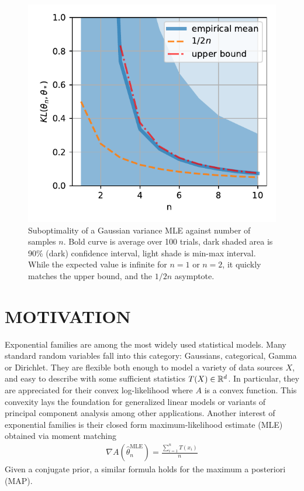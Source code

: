 \documentclass[twoside]{article}
\let\oldsection\section
\renewcommand{\section}[1]{\oldsection{\texorpdfstring{\uppercase{#1}}{#1}}}
\newcommand{\cond}{\,\vert\,}
\newcommand{\logpart}{A}
\newcommand{\nat}{\theta}
\newcommand{\lin}[1]{\left\langle#1\right\rangle}
\begin{document}
\begin{figure}[t]
	\centering
\includegraphics[width=.4\textwidth]{fewsamples.pdf}
	\caption{Suboptimality of a Gaussian variance MLE against number of samples $n$. Bold curve is average over 100 trials,  dark shaded area is 90\% (dark) confidence interval, light shade is min-max interval.
		While the expected value is infinite for $n=1$ or $n=2$, it quickly matches the upper bound, and the $1/2n$ asymptote.
	}
	\label{fig:curves}
\end{figure}


\section{Motivation}

Exponential families are among the most widely used statistical models.
Many standard random variables fall into this category: Gaussians, categorical, Gamma or Dirichlet.
They are flexible both enough to model a variety of data sources $X$, and easy to describe with some sufficient statistics $T(X) \in \mathbb{R}^d$.
In particular, they are appreciated for their convex log-likelihood
\alignn{
f(\nat) = \E[-\log p(X \cond \nat)] = \logpart(\nat) - \lin{\E[T(X)] , \nat}
}
where $\logpart$ is a convex function.
This convexity lays the foundation for generalized linear models \citep{mccullagh1989generalized} 
or variants of principal component analysis \citep{collins2001generalization} among other applications.
Another interest of exponential families is their closed form maximum-likelihood estimate (MLE) obtained via moment matching
\begin{align}
	\nabla \logpart(\hat \nat_n^\text{MLE}) = \frac{\sum_{i=1}^n T(x_i)}{n} 
\end{align}
Given a conjugate prior, a similar formula holds for the maximum a posteriori (MAP).
\end{document}
